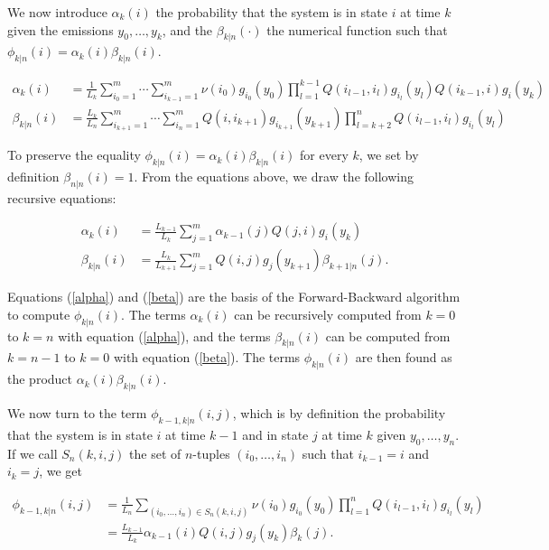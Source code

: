 \documentclass[12pt]{article}
\begin{document}
\begin{appendices}
    We now introduce $\alpha_k(i)$ the probability that the
    system is in state $i$ at time $k$ given the emissions
    $y_0, \ldots, y_k$, and the $\beta_{k|n}(\cdot)$ the numerical
    function such that $\phi_{k|n}(i) = \alpha_k(i)\beta_{k|n}(i)$.
    
    \begin{align*}
      \alpha_k(i) &= \frac{1}{L_k}
      \sum_{i_0=1}^m \cdots \sum_{i_{k-1}=1}^m
      \nu(i_0)g_{i_0}(y_0) \prod_{l=1}^{k-1} Q(i_{l-1},i_l) g_{i_l}(y_l)
      Q(i_{k-1}, i)g_i(y_k) \\
      \beta_{k|n}(i) &= \frac{L_k}{L_n}
      \sum_{i_{k+1}=1}^m \cdots \sum_{i_n=1}^m
      Q(i, i_{k+1})g_{i_{k+1}}(y_{k+1})
      \prod_{l=k+2}^n Q(i_{l-1}, i_l)g_{i_l}(y_l)
    \end{align*}

    To preserve the equality $\phi_{k|n}(i) = \alpha_k(i)\beta_{k|n}(i)$
    for every $k$, we set by definition $\beta_{n|n}(i) = 1$.
    From the equations above, we draw the following recursive
    equations:

    \begin{align} \alpha_k(i) &= \frac{L_{k-1}}{L_k}
      \sum_{j=1}^m \alpha_{k-1}(j) Q(j,i) g_i(y_k) \label{alpha} \\
      \beta_{k|n}(i) &= \frac{L_k}{L_{k+1}}
      \sum_{j=1}^m Q(i,j) g_j(y_{k+1})
      \beta_{k+1|n}(j). \label{beta}
    \end{align}

    Equations (\ref{alpha}) and (\ref{beta}) are the basis of the
    Forward-Backward algorithm to compute $\phi_{k|n}(i)$. The terms
    $\alpha_k(i)$ can be recursively computed from $k=0$ to $k=n$
    with equation (\ref{alpha}), and the terms $\beta_{k|n}(i)$
    can be computed from $k=n-1$ to $k=0$ with equation (\ref{beta}).
    The terms $\phi_{k|n}(i)$ are then found as the product
    $\alpha_k(i)\beta_{k|n}(i)$.

    We now turn to the term $\phi_{k-1,k|n}(i,j)$, which is by
    definition the probability that the system is in state $i$ at
    time $k-1$ and in state $j$ at time $k$ given $y_0, \ldots, y_n$.
    If we call $S_n(k,i,j)$
    the set of $n$-tuples $(i_0, \ldots, i_n)$ such that
    $i_{k-1} = i$ and $i_k = j$, we get

    \begin{align}
      \phi_{k-1,k|n}(i,j) &= \frac{1}{L_n}
       \sum_{(i_0, \ldots, i_n) \in S_n(k,i,j)}
       \nu(i_0)g_{i_0}(y_0) \prod_{l=1}^n Q(i_{l-1}, i_l)
       g_{i_l}(y_l) \nonumber \\
        &= \frac{L_{k-1}}{L_k}
       \alpha_{k-1}(i) Q(i,j) g_j(y_k) \beta_k(j). \label{phiQ}
    \end{align}


\end{appendices}
\end{document}
